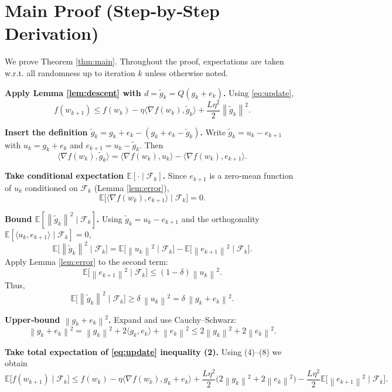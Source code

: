 \documentclass{article}
\newcommand{\E}{\mathbb{E}}
\newcommand{\norm}[1]{\left\|#1\right\|}
\begin{document}
\section*{Main Proof (Step‑by‑Step Derivation)}
We prove Theorem \ref{thm:main}. Throughout the proof, expectations are taken w.r.t. all randomness up to iteration $k$ unless otherwise noted.

\begin{enumerate}[label={[\textbf{Step \arabic*}]}]
\item \textbf{Apply Lemma \ref{lem:descent} with $d=\tilde g_k=Q(g_k+e_k)$.}  
Using \eqref{eq:update},
\[
f(w_{k+1})\le f(w_k)-\eta\langle\nabla f(w_k),\tilde g_k\rangle+\frac{L\eta^{2}}{2}\norm{\tilde g_k}^{2}. \tag{2}
\]

\item \textbf{Insert the definition $\tilde g_k= g_k+e_k-(g_k+e_k-\tilde g_k)$.}  
Write $\tilde g_k = u_k - e_{k+1}$ with $u_k=g_k+e_k$ and $e_{k+1}=u_k-\tilde g_k$. Then
\[
\langle\nabla f(w_k),\tilde g_k\rangle
 =\langle\nabla f(w_k),u_k\rangle-\langle\nabla f(w_k),e_{k+1}\rangle.
\tag{3}
\]

\item \textbf{Take conditional expectation $\E[\cdot\mid\mathcal{F}_k]$.}  
Since $e_{k+1}$ is a zero‑mean function of $u_k$ conditioned on $\mathcal{F}_k$ (Lemma \ref{lem:error}),
\[
\E\!\big[\langle\nabla f(w_k),e_{k+1}\rangle\mid\mathcal{F}_k\big]=0.
\tag{4}
\]

\item \textbf{Bound $\E[\norm{\tilde g_k}^{2}\mid\mathcal{F}_k]$.}  
Using $ \tilde g_k = u_k-e_{k+1}$ and the orthogonality $\E[\langle u_k,e_{k+1}\rangle\mid\mathcal{F}_k]=0$,
\[
\E\!\big[\norm{\tilde g_k}^{2}\mid\mathcal{F}_k\big]
 =\E\!\big[\norm{u_k}^{2}\mid\mathcal{F}_k\big]-\E\!\big[\norm{e_{k+1}}^{2}\mid\mathcal{F}_k\big].
\tag{5}
\]
Apply Lemma \ref{lem:error} to the second term:
\[
\E\!\big[\norm{e_{k+1}}^{2}\mid\mathcal{F}_k\big]\le (1-\delta)\norm{u_k}^{2}.
\tag{6}
\]
Thus,
\[
\E\!\big[\norm{\tilde g_k}^{2}\mid\mathcal{F}_k\big]\ge \delta\,\norm{u_k}^{2}
= \delta\,\norm{g_k+e_k}^{2}. \tag{7}
\]

\item \textbf{Upper‑bound $\norm{g_k+e_k}^{2}$.}  
Expand and use Cauchy–Schwarz:
\[
\norm{g_k+e_k}^{2}= \norm{g_k}^{2}+2\langle g_k,e_k\rangle+\norm{e_k}^{2}
\le 2\norm{g_k}^{2}+2\norm{e_k}^{2}. \tag{8}
\]

\item \textbf{Take total expectation of \eqref{eq:update} inequality (2).}  
Using (4)–(8) we obtain
\[
\E\!\big[f(w_{k+1})\mid\mathcal{F}_k\big]
\le f(w_k)-\eta\langle\nabla f(w_k),g_k+e_k\rangle
+\frac{L\eta^{2}}{2}\big(2\norm{g_k}^{2}+2\norm{e_k}^{2}\big)
-\frac{L\eta^{2}}{2}\E\!\big[\norm{e_{k+1}}^{2}\mid\mathcal{F}_k\big]. \tag{9}
\]


\end{enumerate}
\end{document}
